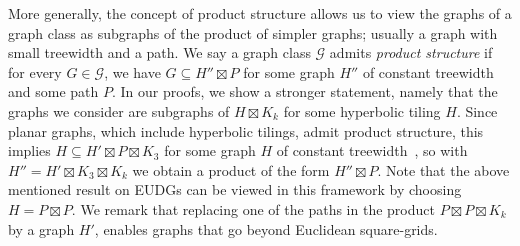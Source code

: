 \documentclass[a4paper,english,cleveref,thm-restate]{lipics-v2021}
\newcommand{\calG}{\ensuremath{\mathcal{G}}\xspace}
\begin{document}
More generally, the concept of product structure allows us to view the graphs of a graph class as subgraphs of the product of simpler graphs; usually a graph with small treewidth and a path.
We say a graph class \calG admits \emph{product structure} if for every $ G \in \calG $, we have $ G \subseteq H'' \boxtimes P $ for some graph $ H'' $ of constant treewidth and some path $ P $.
In our proofs, we show a stronger statement, namely that the graphs we consider are subgraphs of $ H \boxtimes K_k $ for some hyperbolic tiling $ H $.
Since planar graphs, which include hyperbolic tilings, admit product structure, this implies $ H \subseteq H' \boxtimes P \boxtimes K_3 $ for some graph $ H $ of constant treewidth~\cite{dujmovic_planar_2019,dujmovic_planar_2019_conf}, so with $ H'' = H' \boxtimes K_3 \boxtimes K_k $ we obtain a product of the form $ H'' \boxtimes P $.
Note that the above mentioned result on EUDGs can be viewed in this framework by choosing $ H = P \boxtimes P $.
% 
%
We remark that replacing one of the paths in the product $ P \boxtimes P \boxtimes K_k $ by a graph $ H' $, enables graphs that go beyond Euclidean square-grids.
\end{document}

